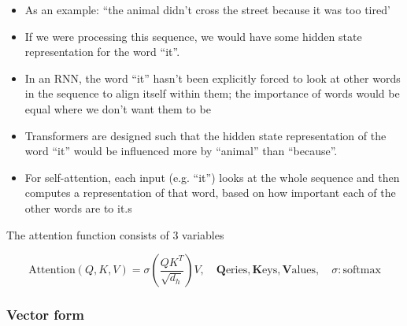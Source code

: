 \documentclass[11pt]{article}
\begin{document}
\begin{minipage}[r]{.45\linewidth}
    \begin{itemize}
        \item As an example: ``the animal didn't cross the street because it was too tired'
        \item If we were processing this sequence, we would have some hidden state representation for the word ``it''.
        \item In an RNN, the word ``it'' hasn't been explicitly forced to look at other words in the sequence to align itself within them; the importance of words would be equal where we don't want them to be
        \item Transformers are designed such that the hidden state representation of the word ``it'' would be influenced more by ``animal'' than ``because''.
        \item For self-attention, each input (e.g. ``it'') looks at the whole sequence and then computes a representation of that word, based on how important each of the other words are to it.s
    \end{itemize}
\end{minipage}

The attention function consists of 3 variables

\begin{equation}
    \text{Attention}(Q,K,V)=\sigma(\frac{QK^T}{\sqrt{d_h}})V,\quad \textbf{Q}\text{eries},\textbf{K}\text{eys}, \textbf{V}\text{alues}, \quad \sigma: \text{softmax}
\end{equation}

\subsubsection{Vector form}
\end{document}
